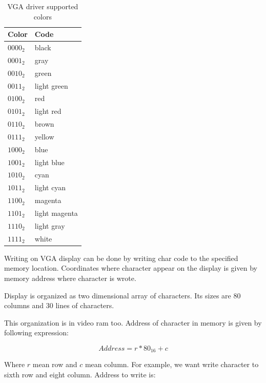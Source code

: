 \begin{table}[h]
    \centering
    \begin{tabular}{|l|l|}
        \hline
        \textbf{Color} & \textbf{Code}  \\ \hline
        $0000_{2}$     & black          \\ \hline
        $0001_{2}$     & gray           \\ \hline
        $0010_{2}$     & green          \\ \hline
        $0011_{2}$     & light green    \\ \hline
        $0100_{2}$     & red            \\ \hline
        $0101_{2}$     & light red      \\ \hline
        $0110_{2}$     & brown          \\ \hline
        $0111_{2}$     & yellow         \\ \hline
        $1000_{2}$     & blue           \\ \hline
        $1001_{2}$     & light blue     \\ \hline
        $1010_{2}$     & cyan           \\ \hline
        $1011_{2}$     & light cyan     \\ \hline
        $1100_{2}$     & magenta        \\ \hline
        $1101_{2}$     & light magenta  \\ \hline
        $1110_{2}$     & light gray     \\ \hline
        $1111_{2}$     & white          \\ \hline
    \end{tabular}
    \caption{VGA driver supported colors}
    \label{tab:vga_collors_codes}
\end{table}

Writing on VGA display can be done by writing char code to the specified memory
location. Coordinates where character appear on the display is given by memory
address where character is wrote.

Display is organized as two dimensional array of characters. Its sizes are 80
columns and 30 lines of characters.

This organization is in video ram too. Address of character in memory is given
by following expression:

$$
    Address = r * 80_{16} + c
$$

Where $r$ mean row and $c$ mean column. For example, we want write character to
sixth row and eight column. Address to write is:

